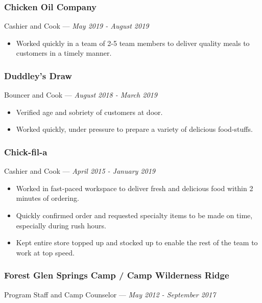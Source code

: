 \documentclass[letterpaper,10pt]{article}
\begin{document}
    \subsubsection{Chicken Oil Company}
    \hfill Cashier and Cook --- \emph{May 2019 - August 2019}

    \begin{itemize}
        \tightlist{}
            \item 
            Worked quickly in a team of 2-5 team members to deliver quality meals to customers in a timely manner.
    \end{itemize}

    \subsubsection{Duddley's Draw}
    \hfill Bouncer and Cook --- \emph{August 2018 - March 2019}

    \begin{itemize}
        \tightlist{}
        \item 
        Verified age and sobriety of customers at door.
        \item
        Worked quickly, under pressure to prepare a variety of delicious food-stuffs.
    \end{itemize}


    \subsubsection{Chick-fil-a}
    \hfill Cashier and Cook --- \emph{April 2015 - January 2019}

    \begin{itemize}
        \tightlist{}
        \item
        Worked in fast-paced workspace to deliver fresh and delicious food within 2 minutes of ordering.
        \item
        Quickly confirmed order and requested specialty items to be made on time, especially during rush hours.
        \item
        Kept entire store topped up and stocked up to enable the rest of the team to work at top speed.
    \end{itemize}

    \subsubsection{Forest Glen Springs Camp / Camp Wilderness Ridge}
    \hfill Program Staff and Camp Counselor --- \emph{May 2012 - September 2017}
\end{document}
